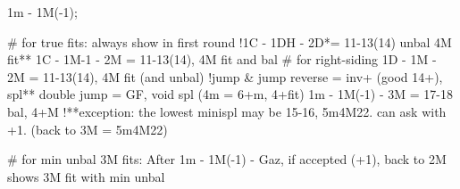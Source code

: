 1m - 1M(-1); 

# for true fits: always show in first round
!1C - 1DH - 2D*= 11-13(14) unbal 4M fit**
1C - 1M-1 - 2M = 11-13(14), 4M fit and bal  # for right-siding
1D - 1M - 2M = 11-13(14), 4M fit (and unbal)
!jump & jump reverse = inv+ (good 14+), spl**
double jump = GF, void spl (4m = 6+m, 4+fit)
1m - 1M(-1) - 3M = 17-18 bal, 4+M
!**exception: the lowest minispl may be 15-16, 5m4M22. can ask with +1. (back to 3M = 5m4M22)

# for min unbal 3M fits:
After 1m - 1M(-1) - Gaz, if accepted (+1), back to 2M shows 3M fit with min unbal
